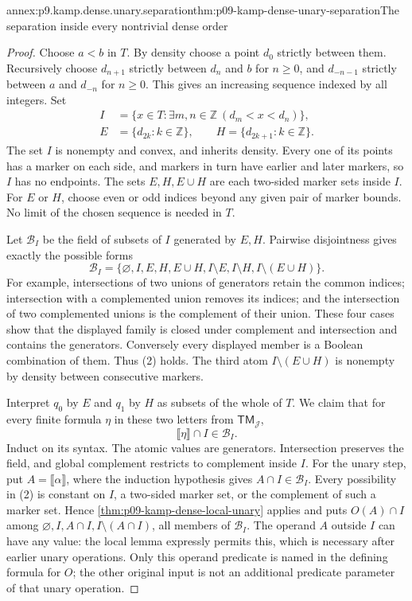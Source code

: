 \begin{annexitem}{annex:p9.kamp.dense.unary.separation}{thm:p09-kamp-dense-unary-separation}{The separation inside every nontrivial dense order}
\begin{proof}
Choose \(a<b\) in \(T\). By density choose a point
\(d_0\) strictly between them. Recursively choose
\(d_{n+1}\) strictly between \(d_n\) and \(b\) for
\(n\geq0\), and \(d_{-n-1}\) strictly between \(a\)
and \(d_{-n}\) for \(n\geq0\). This gives an increasing
sequence indexed by all integers. Set
\[
\begin{aligned}
 I&=\{x\in T:\exists m,n\in\mathbb Z\ (d_m<x<d_n)\},\\
 E&=\{d_{2k}:k\in\mathbb Z\},\qquad
 H=\{d_{2k+1}:k\in\mathbb Z\}.
\end{aligned}
 \tag{1}
\]
The set \(I\) is nonempty and convex, and inherits density.
Every one of its points has a marker on each side, and markers
in turn have earlier and later markers, so \(I\) has no
endpoints. The sets \(E,H,E\cup H\) are each two-sided
marker sets inside \(I\). For \(E\) or \(H\), choose
even or odd indices beyond any given pair of marker bounds.
No limit of the chosen sequence is needed in \(T\).

Let \(\mathcal B_I\) be the field of subsets of \(I\)
generated by \(E,H\). Pairwise disjointness gives exactly
the possible forms
\[
 \mathcal B_I=
 \{\varnothing,I,E,H,E\cup H,I\setminus E,
                  I\setminus H,I\setminus(E\cup H)\}.
 \tag{2}
\]
For example, intersections of two unions of generators retain
the common indices; intersection with a complemented union
removes its indices; and the intersection of two complemented
unions is the complement of their union. These four cases show
that the displayed family is closed under complement and
intersection and contains the generators. Conversely every
displayed member is a Boolean combination of them. Thus (2)
holds. The third atom \(I\setminus(E\cup H)\) is nonempty
by density between consecutive markers.

Interpret \(q_0\) by \(E\) and \(q_1\) by \(H\)
as subsets of the whole of \(T\). We claim that for every
finite formula \(\eta\) in these two letters from
\(\mathsf{TM}_{\mathcal J}\),
\[
                       \llbracket\eta\rrbracket\cap I
                                    \in\mathcal B_I.
 \tag{3}
\]
Induct on its syntax. The atomic values are generators.
Intersection preserves the field, and global complement
restricts to complement inside \(I\). For the unary step,
put \(A=\llbracket\alpha\rrbracket\), where the induction
hypothesis gives \(A\cap I\in\mathcal B_I\). Every
possibility in (2) is constant on \(I\), a two-sided marker
set, or the complement of such a marker set. Hence
\cref{thm:p09-kamp-dense-local-unary} applies and puts
\(O(A)\cap I\) among
\(\varnothing,I,A\cap I,I\setminus(A\cap I)\), all
members of \(\mathcal B_I\). The operand \(A\) outside
\(I\) can have any value: the local lemma expressly permits
this, which is necessary after earlier unary operations.
Only this operand predicate is named in the defining formula
for \(O\); the other original input is not an additional
predicate parameter of that unary operation.


\end{proof}
\end{annexitem}
